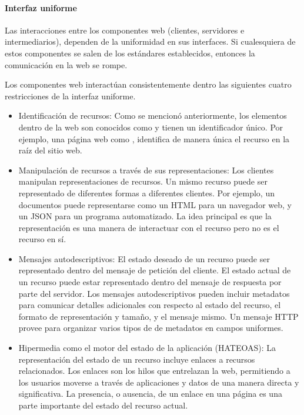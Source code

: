 \paragraph{Interfaz uniforme}
\label{\detokenize{chapter_one/rest:interfaz-uniforme}}
Las interacciones entre los componentes web (clientes, servidores e intermediarios),
dependen de la uniformidad en sus interfaces. Si cualesquiera de estos componentes se
salen de los estándares establecidos, entonces la comunicación en la web
se rompe.

Los componentes web interactúan consistentemente dentro las siguientes
cuatro restricciones de la interfaz uniforme.

\begin{itemize}
    \item 
    Identificación de recursos:
Como se mencionó anteriormente, los elementos dentro de la web son
conocidos como  y tienen un identificador único. Por ejemplo, una
página web como , identifica de manera única el
recurso en la raíz del sitio web.


\item Manipulación de recursos a través de sus representaciones:
Los clientes manipulan representaciones de recursos. Un mismo
recurso puede ser representado de diferentes formas a diferentes
clientes. Por ejemplo, un documentos puede representarse como un HTML
para un navegador web, y un JSON para un programa automatizado. La idea
principal es que la representación es una manera de interactuar con el recurso
pero no es el recurso en sí.


\item Mensajes autodescriptivos:
El estado deseado de un recurso puede ser representado dentro del mensaje
de petición del cliente. El estado actual de un recurso puede estar representado
dentro del mensaje de respuesta por parte del servidor.
Los mensajes autodescriptivos pueden incluir metadatos para comunicar
detalles adicionales con respecto al estado del recurso, el formato
de representación y tamaño, y el mensaje mismo.
Un mensaje HTTP provee  para organizar varios tipos de
de metadatos en campos uniformes.


\item Hipermedia como el motor del estado de la aplicación (HATEOAS):
La representación del estado de un recurso incluye enlaces a recursos
relacionados. Los enlaces son los hilos que entrelazan la web, permitiendo
a los usuarios moverse a través de aplicaciones y datos de una manera directa
y significativa. La presencia, o ausencia, de un enlace en una página es una
parte importante del estado del recurso actual.


\end{itemize}


